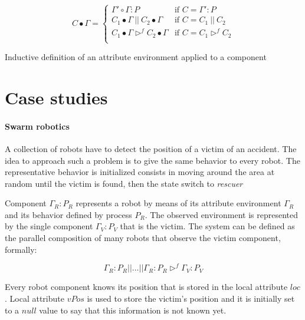 \documentclass{article}
\theoremstyle{remark}
\begin{document}
\begin{table}[htbp]
		$$ 
			C \bullet \Gamma = \left\{ 
			\begin{array}{ll}
				\Gamma' \circ \Gamma:P & \text{if } C = \Gamma' : P \\[5px]
				C_1 \bullet \Gamma\ ||\ C_2 \bullet \Gamma & \text{if } C = C_1\ ||\ C_2 \\[5px]
				C_1 \bullet \Gamma \triangleright^f C_2 \bullet \Gamma & \text{if } C = C_1 \triangleright^f C_2 \\
			\end{array}
			\right.
		$$
	\caption{Inductive definition of an attribute environment applied to a component}
	\label{tab:apply_attribute_environment}
\end{table}



\section{Case studies} %
\label{sec:case_studies}

\paragraph{Swarm robotics} %
\label{par:swarm_robotics}
A collection of robots have to detect the position of a victim of an accident. The idea to approach such a problem  is to give the same behavior to every robot. The representative behavior is initialized consists in moving around the area at random until the victim is found, then the state switch to \emph{rescuer}

Component $\Gamma_R : P_R$ represents a robot by means of its attribute environment $\Gamma_R$ and its behavior defined by process $P_R$. The observed environment is represented by the single component $\Gamma_V : P_V$ that is the victim. The system can be defined as the parallel composition of many robots that observe the victim component, formally:

$$ \Gamma_R : P_R || \dots || \Gamma_R : P_R \triangleright^f \Gamma_V : P_V $$

Every robot component knows its position that is stored in the local attribute $loc$. Local attribute $vPos$ is used to store the victim's position and it is initially set to a $null$ value to say that this information is not known yet. 
\end{document}

